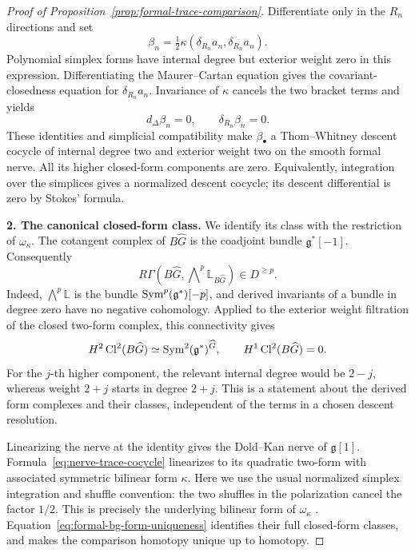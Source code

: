 \begin{proof}[Proof of Proposition~\ref{prop:formal-trace-comparison}]
Differentiate only in the \(R_n\) directions and set
\begin{equation}
\label{eq:nerve-trace-cocycle}
                       \beta_n
                  =\tfrac12\kappa(\delta_{R_n}a_n,\delta_{R_n}a_n).
\end{equation}
Polynomial simplex forms have internal degree but exterior weight
zero in this expression.  Differentiating the Maurer--Cartan equation
gives the covariant-closedness equation for \(\delta_{R_n}a_n\).
Invariance of \(\kappa\) cancels the two bracket terms and yields
\[
                         d_\Delta\beta_n=0,
                         \qquad \delta_{R_n}\beta_n=0.
\]
These identities and simplicial compatibility make \(\beta_\bullet\)
a Thom--Whitney descent cocycle of internal degree two and exterior
weight two on the smooth formal nerve.  All its higher closed-form
components are zero.  Equivalently, integration over the simplices
gives a normalized descent cocycle; its descent differential is zero
by Stokes' formula.

\smallskip\noindent\textbf{2. The canonical closed-form class.}\quad
We identify its class with the restriction of \(\omega_\kappa\).
The cotangent complex of \(B\widehat G\) is the coadjoint bundle
\(\mathfrak g^*[-1]\).  Consequently
\[
 R\Gamma(B\widehat G,\mathop{\bigwedge}\nolimits^p
                  \mathbb L_{B\widehat G})\in D^{\geq p}.
\]
Indeed, \(\bigwedge^p\mathbb L\) is the bundle
\(\operatorname{Sym}^p(\mathfrak g^*)[-p]\), and derived invariants of a bundle in
degree zero have no negative cohomology.  Applied to the exterior
weight filtration of the closed two-form complex, this connectivity
gives
\begin{equation}
\label{eq:formal-bg-form-uniqueness}
 H^2\operatorname{Cl}^2(B\widehat G)
       \simeq \operatorname{Sym}^2(\mathfrak g^*)^{\widehat G},
 \qquad H^1\operatorname{Cl}^2(B\widehat G)=0.
\end{equation}
For the \(j\)-th higher component, the relevant internal degree would
be \(2-j\), whereas weight \(2+j\) starts in degree \(2+j\).
This is a statement about the derived form complexes and their
classes, independent of the terms in a chosen descent resolution.

Linearizing the nerve at the identity gives the Dold--Kan nerve of
\(\mathfrak g[1]\).  Formula~\eqref{eq:nerve-trace-cocycle}
linearizes to its quadratic two-form with associated symmetric
bilinear form \(\kappa\).  Here we use the usual normalized simplex
integration and shuffle convention: the two shuffles in the
polarization cancel the factor \(1/2\).
This is precisely the underlying bilinear form of
\(\omega_\kappa\) \cite[\S1.2, classifying stacks]{PTVV2013}.
Equation~\eqref{eq:formal-bg-form-uniqueness} identifies their full
closed-form classes, and makes the comparison homotopy unique up
to homotopy.


\end{proof}
